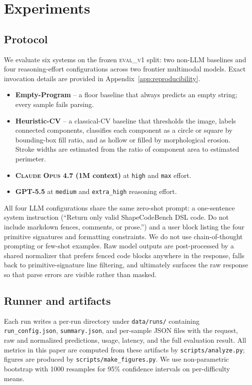 \section{Experiments}
\label{sec:experiments}

\subsection{Protocol}

We evaluate six systems on the frozen \textsc{eval\_v1} split: two non-LLM
baselines and four reasoning-effort configurations across two frontier
multimodal models. Exact invocation details are provided in
Appendix~\ref{app:reproducibility}.
\begin{itemize}
  \item \textbf{Empty-Program} -- a floor baseline that always predicts an empty
    string; every sample fails parsing.
  \item \textbf{Heuristic-CV} -- a classical-CV baseline that thresholds the
    image, labels connected components, classifies each component as a circle or
    square by bounding-box fill ratio, and as hollow or filled by morphological
    erosion. Stroke widths are estimated from the ratio of component area to
    estimated perimeter.
  \item \textbf{\textsc{Claude Opus 4.7} (1M context)} at \texttt{high} and
    \texttt{max} effort.
  \item \textbf{\textsc{GPT-5.5}} at \texttt{medium} and \texttt{extra\_high}
    reasoning effort.
\end{itemize}

All four LLM configurations share the same zero-shot prompt: a one-sentence
system instruction (``Return only valid ShapeCodeBench DSL code. Do not include
markdown fences, comments, or prose.'') and a user block listing the four
primitive signatures and formatting constraints. We do not use chain-of-thought
prompting or few-shot examples. Raw model outputs are post-processed by a shared
normalizer that prefers fenced code blocks anywhere in the response, falls back
to primitive-signature line filtering, and ultimately surfaces the raw response
so that parse errors are visible rather than masked.

\subsection{Runner and artifacts}

Each run writes a per-run directory under \texttt{data/runs/} containing
\texttt{run\_config.json}, \texttt{summary.json}, and per-sample JSON files with
the request, raw and normalized predictions, usage, latency, and the full
evaluation result. All metrics in this paper are computed from these artifacts by
\texttt{scripts/analyze.py}; figures are produced by
\texttt{scripts/make\_figures.py}. We use non-parametric bootstrap with 1000
resamples for 95\% confidence intervals on per-difficulty means.

